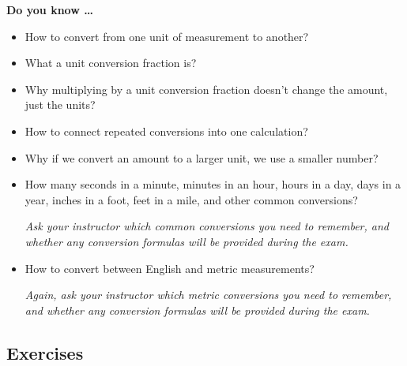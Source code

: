 
 

\noindent \textbf{Do you know \ldots}

 \begin{itemize}
\item How to convert from one unit of measurement to another?   
\item What a unit conversion fraction is?   
\item Why multiplying by a unit conversion fraction doesn't change the amount, just the units?   
\item How to connect repeated conversions into one calculation?   
\item Why if we convert an amount to a larger unit, we use a smaller number?  
\item How many seconds in a minute, minutes in an hour, hours in a day, days in a year, inches in a foot, feet in a mile, and other common conversions? 

\emph{Ask your instructor which common conversions you need to remember, and whether any conversion formulas will be provided during the exam.}   
\item How to convert between English and metric measurements? 

\emph{Again, ask your instructor which metric conversions you need to remember, and whether any conversion formulas will be provided during the exam.} 
  
\end{itemize}

\subsection*{Exercises}

